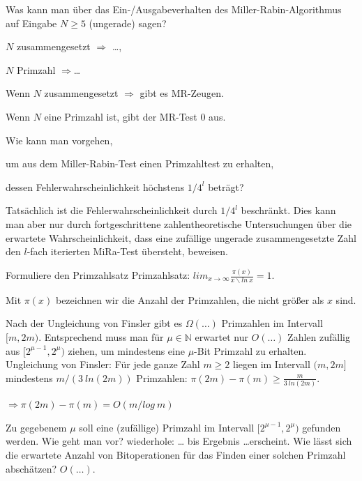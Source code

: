 \documentclass[avery5371, frame]{flashcards}
\begin{document}
\begin{flashcard}[Primzahlen]{Was kann man über das Ein-/Ausgabeverhalten des Miller-Rabin-Algorithmus auf Eingabe $N\geq 5$ (ungerade) sagen?

        $N$ zusammengesetzt $\Rightarrow$ \dots,

        $N$ Primzahl $\Rightarrow$\dots}
    Wenn $N$ zusammengesetzt $\Rightarrow$ gibt es MR-Zeugen.

    Wenn $N$ eine Primzahl ist, gibt der MR-Test $0$ aus.
\end{flashcard}

\begin{flashcard}[Primzahlen]{Wie kann man vorgehen,

        um aus dem Miller-Rabin-Test einen Primzahltest zu erhalten,

        dessen Fehlerwahrscheinlichkeit höchstens $1/4^l$ beträgt?}
    Tatsächlich ist die Fehlerwahrscheinlichkeit durch $1/4^l$ beschränkt. Dies kann man aber nur durch fortgeschrittene zahlentheoretische Untersuchungen über die erwartete Wahrscheinlichkeit, dass eine zufällige ungerade zusammengesetzte Zahl den $l$-fach iterierten MiRa-Test übersteht, beweisen.
\end{flashcard}

\begin{flashcard}[Primzahlen]{Formuliere den Primzahlsatz}
    Primzahlsatz: $lim_{x\rightarrow \infty} \frac{\pi(x)}{x\backslash ln\ x}= 1$.

    Mit $\pi(x)$ bezeichnen wir die Anzahl der Primzahlen, die nicht größer als $x$ sind.
\end{flashcard}

\begin{flashcard}[Primzahlen]{Nach der Ungleichung von Finsler gibt es $\Omega(\dots)$ Primzahlen im Intervall $[m, 2m)$. Entsprechend muss man für $\mu\in\mathbb{N}$ erwartet nur $O(\dots)$ Zahlen zufällig aus $[2^{\mu-1}, 2^{\mu})$ ziehen, um mindestens eine $\mu$-Bit Primzahl zu erhalten.}
                    Ungleichung von Finsler: Für jede ganze Zahl $m\geq 2$ liegen im Intervall $(m, 2m]$ mindestens $m/(3\ ln(2m))$ Primzahlen: $\pi (2m)-\pi(m)\geq \frac{m}{3\ ln(2m)}$.

    $\Rightarrow \pi(2m)-\pi(m) = O(m/log\ m)$
\end{flashcard}

\begin{flashcard}[Primzahlen]{Zu gegebenem $\mu$ soll eine (zufällige) Primzahl im Intervall $[2^{\mu-1}, 2^{\mu})$ gefunden werden. Wie geht man vor?}
    wiederhole: \dots
    bis Ergebnis \dots erscheint.
    Wie lässt sich die erwartete Anzahl von Bitoperationen für das Finden einer solchen Primzahl abschätzen? $O(\dots)$.
\end{flashcard}
\end{document}
